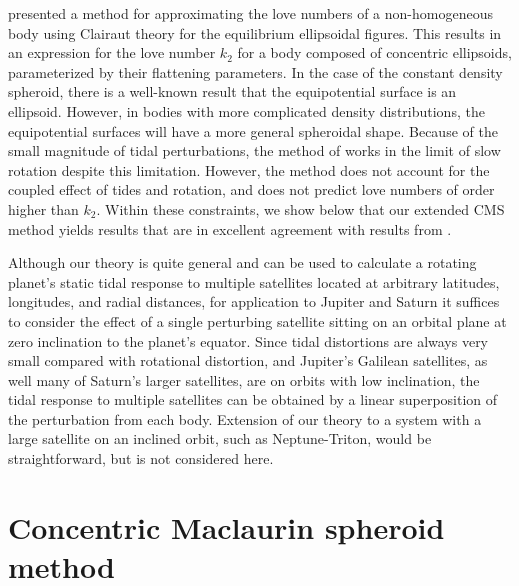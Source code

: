\citet{folonier2015} presented a method for approximating the love numbers of a
non-homogeneous body using Clairaut theory for the equilibrium ellipsoidal
figures.  This results in an expression for the love number $k_2$ for a body
composed of concentric ellipsoids, parameterized by their flattening
parameters. In the case of the constant density spheroid, there is a well-known
result that the equipotential surface is an ellipsoid. However, in bodies with
more complicated density distributions, the equipotential surfaces will have a
more general spheroidal shape.  Because of the small magnitude of tidal
perturbations, the method of \citet{folonier2015} works in the limit of slow
rotation despite this limitation.  However, the method does not account for the
coupled effect of tides and rotation, and does not predict love numbers of
order higher than $k_2$.  Within these constraints, we show below that our
extended CMS method yields results that are in excellent agreement with results
from \citet{folonier2015}.

Although our theory is quite general and can be used to calculate a rotating
planet's static tidal response to multiple satellites located at arbitrary
latitudes, longitudes, and radial distances, for application to Jupiter and
Saturn it suffices to consider the effect of a single perturbing satellite
sitting on an orbital plane at zero inclination to the planet's equator.  Since
tidal distortions are always very small compared with rotational distortion,
and Jupiter's Galilean satellites, as well many of Saturn's larger satellites,
are on orbits with low inclination, the tidal response to multiple satellites
can be obtained by a linear superposition of the perturbation from each body.
Extension of our theory to a system with a large satellite on an inclined
orbit, such as Neptune-Triton, would be straightforward, but is not considered
here.

\section{Concentric Maclaurin spheroid method }

